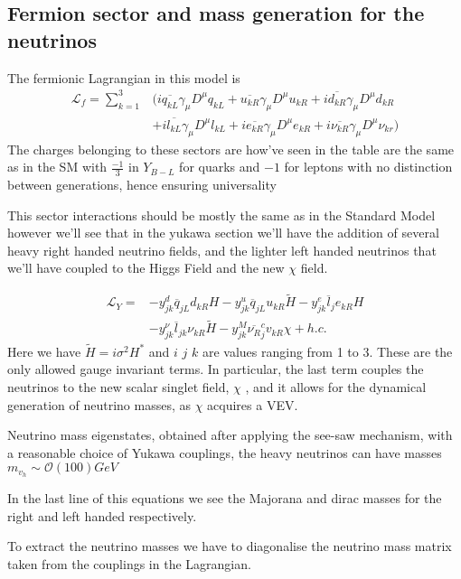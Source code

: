 \documentclass[11pt,twoside,a4paper]{article}
\begin{document}
\subsection{Fermion sector and mass generation for the neutrinos}
The fermionic Lagrangian in this model is
\begin{align}
\mathcal{L}_f = \sum_{k=1}^{3}  & ( i \overline{q_{kL}} \gamma_\mu D^\mu q_{kL} + \overline{u_{kR}} \gamma_\mu D^\mu u_{kR} 
 +   i \overline{d_{kR}} \gamma_\mu D^\mu d_{kR}  \\  &  + i \overline{l_{kL}} \gamma_\mu D^\mu l_{kL} + i \overline{e_{kR}} \gamma_\mu D^\mu  e_{kR} + i \overline{\nu_{kR}} \gamma_\mu D^\mu \nu_{kr} )
\end{align}
The charges belonging to these sectors are how've seen in the table are the same as in the SM with $\frac{-1}{3}$ in $Y_{B-L}$ for quarks and $-1$ for leptons with no distinction between generations, hence ensuring universality 

This sector interactions should be mostly the same as in the Standard Model however we'll see that in the yukawa section we'll have the addition of several heavy right handed neutrino fields, and the lighter left handed neutrinos that we'll have coupled to the Higgs Field and the new $\chi$ field.  

\begin{align}
\mathcal{L}_Y= & -y^d_{jk}\overline{q}_{jL} d_{kR} H - y_{jk}^u \overline{q}_{jL} u_{kR} \tilde{H} - y^e_{jk} \overline{l}_j e_{kR} H \\ & -  y^\nu_{jk}\overline{l}_{jk} \nu_{kR} \tilde{H} - y^M_{jk}\overline{\nu_R}^c_j v_{kR} \chi + h.c.
\end{align}
Here we have $\tilde{H}=i\sigma^2 H^* $ and $i$ $j$ $k$ are values ranging from 1 to 3.  These are the only allowed gauge invariant terms. In particular, the last term couples the
neutrinos to the new scalar singlet field, $\chi$ , and it allows for the dynamical generation of neutrino masses, as $\chi$ acquires a VEV.

Neutrino mass eigenstates, obtained after applying the see-saw mechanism, with a reasonable choice of Yukawa couplings, the heavy neutrinos can have masses $m_{v_h}  \sim \mathcal{O}(100) GeV$

In the last line of this equations we see the Majorana and dirac masses for the right and left  handed respectively. 

To extract the neutrino masses we have to diagonalise the neutrino mass matrix taken from the couplings in the Lagrangian. 
\end{document}
